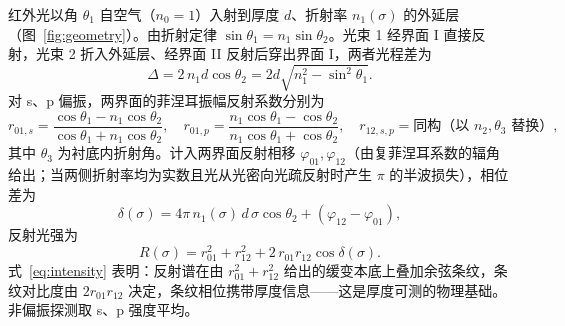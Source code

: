 \documentclass[11pt,a4paper,fontset=fandol]{ctexart}
\begin{document}
红外光以角 $\theta_1$ 自空气（$n_0=1$）入射到厚度 $d$、折射率 $n_1(\sigma)$ 的外延层（图~\ref{fig:geometry}）。由折射定律 $\sin\theta_1=n_1\sin\theta_2$。光束 1 经界面 I 直接反射，光束 2 折入外延层、经界面 II 反射后穿出界面 I，两者光程差为
\begin{equation}
    \Delta = 2\,n_1 d\cos\theta_2 = 2d\sqrt{n_1^2-\sin^2\theta_1}.
    \label{eq:opd}
\end{equation}
对 s、p 偏振，两界面的菲涅耳振幅反射系数分别为
\begin{equation}
    r_{01,s}=\frac{\cos\theta_1-n_1\cos\theta_2}{\cos\theta_1+n_1\cos\theta_2},\quad
    r_{01,p}=\frac{n_1\cos\theta_1-\cos\theta_2}{n_1\cos\theta_1+\cos\theta_2},\quad
    r_{12,s,p}=\text{同构（以 } n_2,\theta_3 \text{ 替换）},
    \label{eq:fresnel}
\end{equation}
其中 $\theta_3$ 为衬底内折射角。计入两界面反射相移 $\varphi_{01},\varphi_{12}$（由复菲涅耳系数的辐角给出；当两侧折射率均为实数且光从光密向光疏反射时产生 $\pi$ 的半波损失），相位差为
\begin{equation}
    \delta(\sigma) = 4\pi\, n_1(\sigma)\, d\,\sigma\cos\theta_2 + (\varphi_{12}-\varphi_{01}),
    \label{eq:phase}
\end{equation}
反射光强为
\begin{equation}
    R(\sigma) = r_{01}^2 + r_{12}^2 + 2\,r_{01}r_{12}\cos\delta(\sigma).
    \label{eq:intensity}
\end{equation}
式~\eqref{eq:intensity} 表明：反射谱在由 $r_{01}^2+r_{12}^2$ 给出的缓变本底上叠加余弦条纹，条纹对比度由 $2r_{01}r_{12}$ 决定，条纹相位携带厚度信息——这是厚度可测的物理基础。非偏振探测取 s、p 强度平均。
\end{document}
